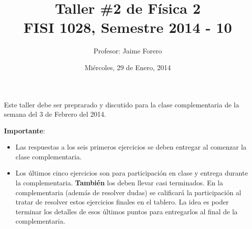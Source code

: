 \documentclass{article}
\title{Taller \#2 de F\'isica 2\\ FISI 1028, Semestre 2014 - 10}
\author{Profesor: Jaime Forero}
\date{Mi\'ercoles, 29 de Enero, 2014}
\begin{document}
\maketitle
\thispagestyle{empty}

\noindent
Este taller debe ser preprarado y discutido para la clase
complementaria de la semana del 3 de Febrero del 2014. 

\noindent
{\bf Importante}:
\begin{itemize}

\item
Las respuestas a los seis primeros ejercicios se deben entregar al comenzar la
clase complementaria. 
\item 
Los \'ultimos cinco ejercicios son para participaci\'on en clase y entrega
durante la complementaria. {\bf{Tambi\'en}} los deben llevar casi
terminados. En la complementaria (adem\'as de resolver dudas) se
calificar\'a la participaci\'on al tratar de resolver estos ejercicios
finales en el tablero. La idea es poder terminar los  detalles de esos
\'ultimos puntos para entregarlos al final de la complementaria.
\end{itemize}
\end{document}
